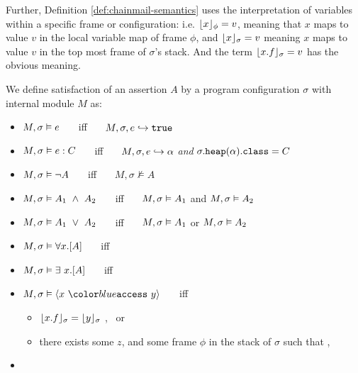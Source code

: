 Further, Definition \ref{def:chainmail-semantics} uses the interpretation of variables
within a specific frame or configuration: i.e. $\lfloor x \rfloor_{\phi} = v$, meaning that $x$ maps to
value $v$ in the local variable map of frame $\phi$, and $\lfloor x \rfloor_{\sigma} = v$ meaning $x$ 
maps to value $v$ in the top most frame of $\sigma$'s stack. And the term  $\lfloor x.f \rfloor_{\sigma} = v$
has the obvious meaning.

\begin{definition} 
\label{def:chainmail-semantics}
We define satisfaction of an assertion $A$ by a program configuration $\sigma$ with internal module $M$ as:
\begin{itemize}
\item
$M , \sigma \vDash e$ \ \ \ iff \ \ \  $M, \sigma, e \hookrightarrow \texttt{true}$
\item
$M , \sigma \vDash e : C$ \ \ \ iff \ \ \  $M, \sigma, e \hookrightarrow \alpha$ \textit{and} $\sigma.{\texttt{heap}}(\alpha).{\texttt{class}} = C$
\item
$M , \sigma \vDash \neg A$ \ \ \ iff \ \ \  ${M},{\sigma}\nvDash{A}$
\item
$\satisfiesA{M}{\sigma}{A_1\ \wedge\ A_2}$ \ \ \ iff \ \ \  $M , \sigma \vDash A_1$ and 
$M , \sigma \vDash A_2$
\item
$\satisfiesA{M}{\sigma}{A_1\ \vee\ A_2}$ \ \ \ iff \ \ \  $M , \sigma \vDash A_1$ or 
$M , \sigma \vDash A_2$
\item
$M , \sigma \vDash \forall x.[A]$ \ \ \ iff \ \ \  
\item
$M , \sigma \vDash \exists\ x.[A]$ \ \ \ iff \ \ \  
\item
$\satisfiesA{M}{\sigma}{\access{x}{y}}$ \ \ \ iff \ \ \  
\begin{itemize}
\item
$\lfloor x.f \rfloor_{\sigma}={\lfloor y \rfloor_{\sigma}}$ \sd{for some $f$}, \  or
\item
there exists some $z$, and some frame $\phi$ in the stack of $\sigma$ such that , 
\end{itemize}
\item

\end{itemize}
\end{definition}
